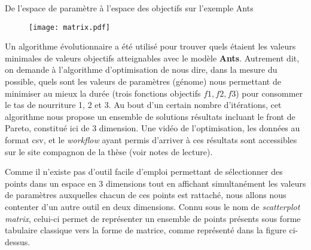 


\begin{testiv}{De l'espace de paramètre à l'espace des objectifs sur l'exemple Ants }{}

\begin{figure}[H]
	 \centering
	 	\texttt{[image: matrix.pdf]}
	 	\label{fig:matrice}
\end{figure}

Un algorithme évolutionnaire a été utilisé pour trouver quels étaient les valeurs minimales de valeurs objectifs atteignables avec le modèle \textbf{Ants}. Autrement dit, on demande à l'algorithme d'optimisation de nous dire, dans la mesure du possible, quels sont les valeurs de paramètres (génome) nous permettant de minimiser au mieux la durée (trois fonctions objectifs ${f1,f2,f3}$) pour consommer le tas de nourriture 1, 2 et 3. Au bout d'un certain nombre d'itérations, cet algorithme nous propose un ensemble de solutions résultats incluant le front de Pareto, constitué ici de 3 dimension. Une vidéo de l'optimisation, les données au format csv, et le \textit{workflow} ayant permis d'arriver à ces résultats sont accessibles sur le site compagnon de la thèse (voir notes de lecture).

Comme il n'existe pas d'outil facile d'emploi permettant de sélectionner des points dans un espace en 3 dimensions tout en affichant simultanément les valeurs de paramètres auxquelles chacun de ces points est rattaché, nous allons nous contenter d'un autre outil en deux dimensions. Connu sous le nom de \textit{scatterplot matrix}, celui-ci permet de représenter un ensemble de points présents sous forme tabulaire classique vers la forme de matrice, comme représenté dans la figure ci-dessus.


\end{testiv}
